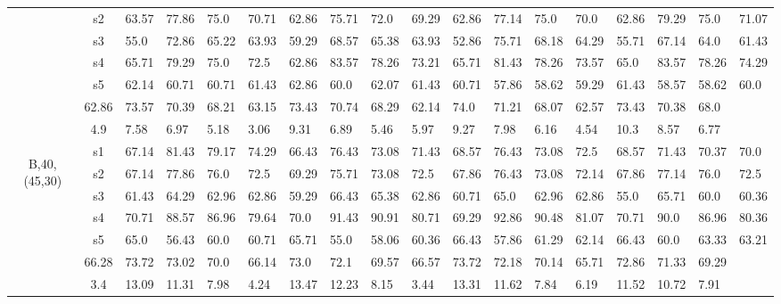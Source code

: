 \begin{table}[h]
{\begin{tabular}{cc|llll|llll|llll|llll}
 & s2 & 63.57 & 77.86 & 75.0 & 70.71 & 62.86 & 75.71 & 72.0 & 69.29 & 62.86 & 77.14 & 75.0 & 70.0 & 62.86 & 79.29 & 75.0 & 71.07 \\
 & s3 & 55.0 & 72.86 & 65.22 & 63.93 & 59.29 & 68.57 & 65.38 & 63.93 & 52.86 & 75.71 & 68.18 & 64.29 & 55.71 & 67.14 & 64.0 & 61.43 \\
 & s4 & 65.71 & 79.29 & 75.0 & 72.5 & 62.86 & 83.57 & 78.26 & 73.21 & 65.71 & 81.43 & 78.26 & 73.57 & 65.0 & 83.57 & 78.26 & 74.29 \\
 & s5 & 62.14 & 60.71 & 60.71 & 61.43 & 62.86 & 60.0 & 62.07 & 61.43 & 60.71 & 57.86 & 58.62 & 59.29 & 61.43 & 58.57 & 58.62 & 60.0 \\
\rowcolor{lightgray!50}\multicolumn{2}{r|}{avg} & 62.86 & 73.57 & 70.39 & 68.21 & 63.15 & 73.43 & 70.74 & 68.29 & 62.14 & 74.0 & 71.21 & 68.07 & 62.57 & 73.43 & 70.38 & 68.0 \\
\rowcolor{lightgray!50}\multicolumn{2}{r|}{std} & 4.9 & 7.58 & 6.97 & 5.18 & 3.06 & 9.31 & 6.89 & 5.46 & 5.97 & 9.27 & 7.98 & 6.16 & 4.54 & 10.3 & 8.57 & 6.77 \\
\multirow{6}{*}{\begin{sideways}B,40,(45,30)\end{sideways}} & s1 & 67.14 & 81.43 & 79.17 & 74.29 & 66.43 & 76.43 & 73.08 & 71.43 & 68.57 & 76.43 & 73.08 & 72.5 & 68.57 & 71.43 & 70.37 & 70.0 \\
 & s2 & 67.14 & 77.86 & 76.0 & 72.5 & 69.29 & 75.71 & 73.08 & 72.5 & 67.86 & 76.43 & 73.08 & 72.14 & 67.86 & 77.14 & 76.0 & 72.5 \\
 & s3 & 61.43 & 64.29 & 62.96 & 62.86 & 59.29 & 66.43 & 65.38 & 62.86 & 60.71 & 65.0 & 62.96 & 62.86 & 55.0 & 65.71 & 60.0 & 60.36 \\
 & s4 & 70.71 & 88.57 & 86.96 & 79.64 & 70.0 & 91.43 & 90.91 & 80.71 & 69.29 & 92.86 & 90.48 & 81.07 & 70.71 & 90.0 & 86.96 & 80.36 \\
 & s5 & 65.0 & 56.43 & 60.0 & 60.71 & 65.71 & 55.0 & 58.06 & 60.36 & 66.43 & 57.86 & 61.29 & 62.14 & 66.43 & 60.0 & 63.33 & 63.21 \\
\rowcolor{lightgray!50}\multicolumn{2}{r|}{avg} & 66.28 & 73.72 & 73.02 & 70.0 & 66.14 & 73.0 & 72.1 & 69.57 & 66.57 & 73.72 & 72.18 & 70.14 & 65.71 & 72.86 & 71.33 & 69.29 \\
\rowcolor{lightgray!50}\multicolumn{2}{r|}{std} & 3.4 & 13.09 & 11.31 & 7.98 & 4.24 & 13.47 & 12.23 & 8.15 & 3.44 & 13.31 & 11.62 & 7.84 & 6.19 & 11.52 & 10.72 & 7.91
\end{tabular}}
\end{table}

